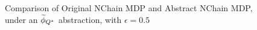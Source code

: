 \begin{figure}[h]
\label{fig:nchain-visual}
\caption{Comparison of Original NChain MDP and Abstract NChain MDP, under an $\widetilde \phi_{Q^*}$ abstraction, with $\epsilon=0.5$}
\end{figure} 


%
%

